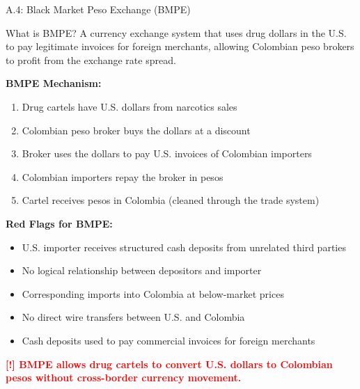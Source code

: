 \documentclass[11pt,a4paper]{beamer}
\newcommand{\redflag}[1]{\textcolor{red}{\textbf{[!] #1}}}
\begin{document}
	\begin{frame}{A.4: Black Market Peso Exchange (BMPE)}
		\begin{block}{What is BMPE?}
			A currency exchange system that uses drug dollars in the U.S. to pay legitimate invoices for foreign merchants, allowing Colombian peso brokers to profit from the exchange rate spread.
		\end{block}
		\textbf{BMPE Mechanism:}
		\begin{enumerate}
			\item Drug cartels have U.S. dollars from narcotics sales
			\item Colombian peso broker buys the dollars at a discount
			\item Broker uses the dollars to pay U.S. invoices of Colombian importers
			\item Colombian importers repay the broker in pesos
			\item Cartel receives pesos in Colombia (cleaned through the trade system)
		\end{enumerate}
		\textbf{Red Flags for BMPE:}
		\begin{itemize}
			\item U.S. importer receives structured cash deposits from unrelated third parties
			\item No logical relationship between depositors and importer
			\item Corresponding imports into Colombia at below-market prices
			\item No direct wire transfers between U.S. and Colombia
			\item Cash deposits used to pay commercial invoices for foreign merchants
		\end{itemize}
		\redflag{BMPE allows drug cartels to convert U.S. dollars to Colombian pesos without cross-border currency movement.}
	\end{frame}
	
\end{document}
